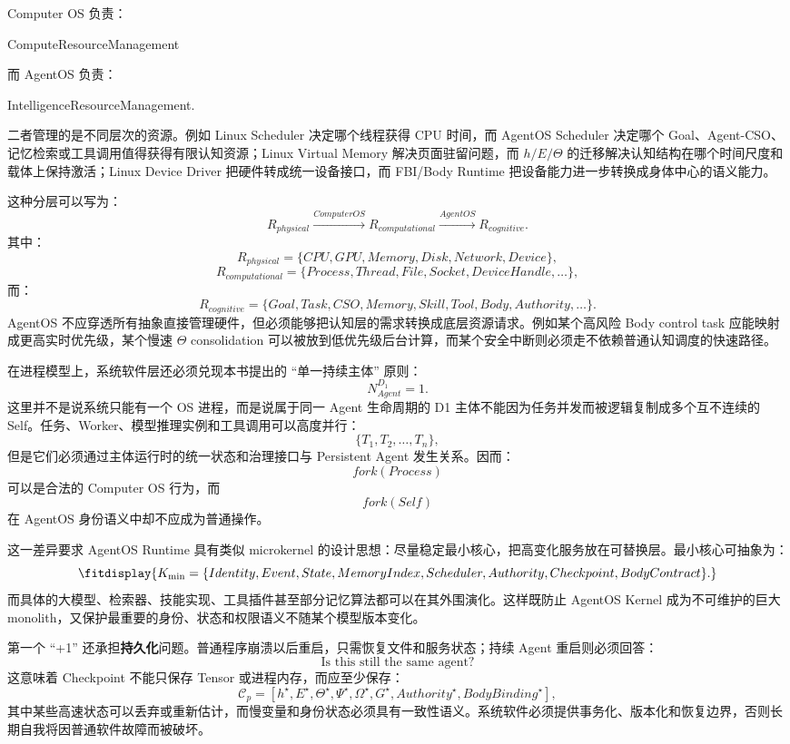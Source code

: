Computer OS 负责：
\begin{statementbox}
ComputeResourceManagement
\end{statementbox}
而 AgentOS 负责：
\begin{statementbox}
IntelligenceResourceManagement.
\end{statementbox}
二者管理的是不同层次的资源。例如 Linux Scheduler 决定哪个线程获得 CPU 时间，而 AgentOS Scheduler 决定哪个 Goal、Agent-CSO、记忆检索或工具调用值得获得有限认知资源；Linux Virtual Memory 解决页面驻留问题，而 $h/E/\Theta$ 的迁移解决认知结构在哪个时间尺度和载体上保持激活；Linux Device Driver 把硬件转成统一设备接口，而 FBI/Body Runtime 把设备能力进一步转换成身体中心的语义能力。

这种分层可以写为：
\[
R_{physical}
\xrightarrow{ComputerOS}
R_{computational}
\xrightarrow{AgentOS}
R_{cognitive}.
\]
其中：
\[
R_{physical}
=
\{CPU,GPU,Memory,Disk,Network,Device\},
\]
\[
R_{computational}
=
\{Process,Thread,File,Socket,DeviceHandle,\ldots\},
\]
而：
\[
R_{cognitive}
=
\{Goal,Task,CSO,Memory,Skill,Tool,Body,Authority,\ldots\}.
\]
AgentOS 不应穿透所有抽象直接管理硬件，但必须能够把认知层的需求转换成底层资源请求。例如某个高风险 Body control task 应能映射成更高实时优先级，某个慢速 $\Theta$ consolidation 可以被放到低优先级后台计算，而某个安全中断则必须走不依赖普通认知调度的快速路径。

在进程模型上，系统软件层还必须兑现本书提出的 ``单一持续主体'' 原则：
\[
\boxed{
N_{Agent}^{D_1}=1.
}
\]
这里并不是说系统只能有一个 OS 进程，而是说属于同一 Agent 生命周期的 D1 主体不能因为任务并发而被逻辑复制成多个互不连续的 Self。任务、Worker、模型推理实例和工具调用可以高度并行：
\[
\{T_1,T_2,\ldots,T_n\},
\]
但是它们必须通过主体运行时的统一状态和治理接口与 Persistent Agent 发生关系。因而：
\[
fork(Process)
\]
可以是合法的 Computer OS 行为，而
\[
fork(Self)
\]
在 AgentOS 身份语义中却不应成为普通操作。

这一差异要求 AgentOS Runtime 具有类似 microkernel 的设计思想：尽量稳定最小核心，把高变化服务放在可替换层。最小核心可抽象为：
\[
\fitdisplay{
K_{\min}
=
\{
Identity,
Event,
State,
MemoryIndex,
Scheduler,
Authority,
Checkpoint,
BodyContract
\}.
}
\]
而具体的大模型、检索器、技能实现、工具插件甚至部分记忆算法都可以在其外围演化。这样既防止 AgentOS Kernel 成为不可维护的巨大 monolith，又保护最重要的身份、状态和权限语义不随某个模型版本变化。

第一个 ``+1'' 还承担\textbf{持久化}问题。普通程序崩溃以后重启，只需恢复文件和服务状态；持续 Agent 重启则必须回答：
\[
\text{Is this still the same agent?}
\]
这意味着 Checkpoint 不能只保存 Tensor 或进程内存，而应至少保存：
\[
\mathcal C_p
=
\left[
h^\star,
E^\star,
\Theta^\star,
\Psi^\star,
\Omega^\star,
G^\star,
Authority^\star,
BodyBinding^\star
\right],
\]
其中某些高速状态可以丢弃或重新估计，而慢变量和身份状态必须具有一致性语义。系统软件必须提供事务化、版本化和恢复边界，否则长期自我将因普通软件故障而被破坏。

